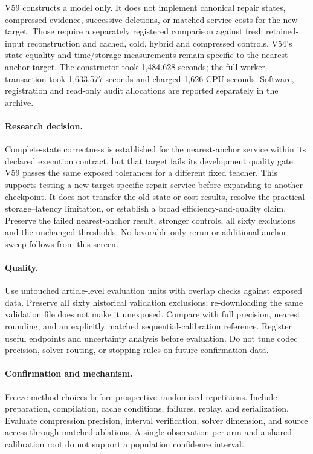 \documentclass[10pt,twocolumn,letterpaper]{article}
\begin{document}
V59 constructs a model only. It does not implement canonical repair states,
compressed evidence, successive deletions, or matched service costs for the new
target. Those require a separately registered comparison against fresh retained-input
reconstruction and cached, cold, hybrid and compressed controls. V54's state-equality
and time/storage measurements remain specific to the nearest-anchor target.
The constructor took 1,484.628 seconds; the full worker transaction took
1,633.577 seconds and charged 1,626 CPU seconds. Software, registration and
read-only audit allocations are reported separately in the archive.

\paragraph{Research decision.}
Complete-state correctness is established for the nearest-anchor service within
its declared execution contract, but that target fails its development quality
gate. V59 passes the same exposed tolerances for a different fixed teacher.
This supports testing a new target-specific repair service before expanding to
another checkpoint. It does not transfer the old state or cost results, resolve
the practical storage--latency limitation, or establish a broad efficiency-and-quality
claim. Preserve the failed nearest-anchor result, stronger controls, all sixty
exclusions and the unchanged thresholds. No favorable-only rerun or additional
anchor sweep follows from this screen.

\paragraph{Quality.}
Use untouched article-level evaluation units with overlap checks against exposed
data. Preserve all sixty historical validation exclusions; re-downloading the
same validation file does not make it unexposed. Compare with full precision,
nearest rounding, and an explicitly matched sequential-calibration reference.
Register useful endpoints and uncertainty analysis before evaluation. Do not tune
codec precision, solver routing, or stopping rules on future confirmation data.

\paragraph{Confirmation and mechanism.}
Freeze method choices before prospective randomized repetitions. Include
preparation, compilation, cache conditions, failures, replay, and serialization.
Evaluate compression precision, interval verification, solver dimension, and
source access through matched ablations. A single observation per arm and a
shared calibration root do not support a population confidence interval.
\end{document}
